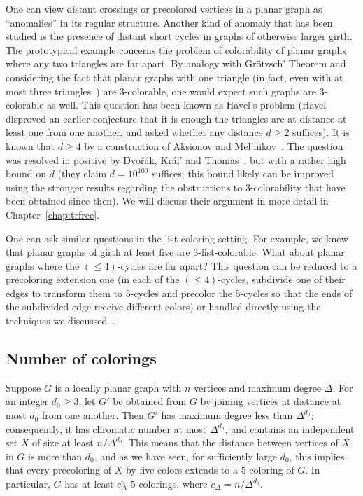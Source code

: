 \documentclass[12pt,twoside,openright,a4paper]{book}
\begin{document}
One can view distant crossings or precolored vertices in a planar graph as ``anomalies'' in its regular structure.
Another kind of anomaly that has been studied is the presence of distant short cycles in graphs of otherwise
larger girth.  The prototypical example concerns the problem of colorability of planar graphs where any two triangles
are far apart.  By analogy with Gr\"{o}tzsch' Theorem and considering the fact that planar graphs with one triangle
(in fact, even with at most three triangles~\cite{aksenov}) are 3-colorable, one would expect such graphs are 3-colorable
as well.  This question has been known as Havel's problem (Havel~\cite{conj-havel} disproved an earlier
conjecture that it is enough the triangles are at distance at least one from one another, and asked whether
any distance $d\ge 2$ suffices).  It is known that $d\ge 4$ by a construction of Aksionov and Mel'nikov~\cite{aksmel}.
The question was resolved in positive by Dvo\v{r}\'ak, Kr\'al' and Thomas~\cite{trfree5}, but with a rather
high bound on $d$ (they claim $d=10^{100}$ suffices; this bound likely can be improved using the stronger results
regarding the obstructions to 3-colorability that have been obtained since then).  We will discuss their
argument in more detail in Chapter~\ref{chap:trfree}.

One can ask similar questions in the list coloring setting.  For example, we know that planar graphs
of girth at least five are $3$-list-colorable.  What about planar graphs where the $(\le\!4)$-cycles are far apart?
This question can be reduced to a precoloring extension one (in each of the $(\le\!4)$-cycles, subdivide one
of their edges to transform them to 5-cycles and precolor the 5-cycles so that the ends of the subdivided
edge receive different colors) or handled directly using the techniques we discussed~\cite{le4far}.

\subsection{Number of colorings}

Suppose $G$ is a locally planar graph with $n$ vertices and maximum degree $\Delta$.
For an integer $d_0\ge 3$, let $G'$ be obtained from $G$ by joining vertices at distance at most $d_0$
from one another.  Then $G'$ has maximum degree less than $\Delta^{d_0}$; consequently,
it has chromatic number at most $\Delta^{d_0}$, and contains an independent set $X$ of size at least
$n/\Delta^{d_0}$.  This means that the distance between vertices of $X$ in $G$ is more than $d_0$,
and as we have seen, for sufficiently large $d_0$, this implies that every precoloring of $X$ by five colors
extends to a $5$-coloring of $G$.  In particular, $G$ has at least $c_\Delta^n$ $5$-colorings,
where $c_\Delta=n/\Delta^{d_0}$.
\end{document}

